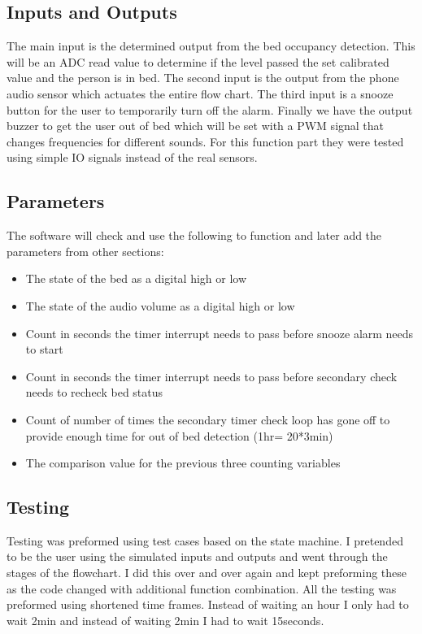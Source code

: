 \documentclass[11pt]{article}
\begin{document}
\subsection*{Inputs and Outputs}
The main input is the determined output from the bed occupancy detection. 
This will be an ADC read value to determine if the level passed the set calibrated value and the person is in bed. 
The second input is the output from the phone audio sensor which actuates the entire flow chart. 
The third input is a snooze button for the user to temporarily turn off the alarm.
Finally we have the output buzzer to get the user out of bed which will be set with a PWM signal that changes frequencies for different sounds. 
For this function part they were tested using simple IO signals instead of the real sensors.

\subsection*{Parameters}
The software will check and use the following to function and later add the parameters from other sections:
\begin{itemize}
	\item The state of the bed as a digital high or low
	\item The state of the audio volume as a digital high or low 
	\item Count in seconds the timer interrupt needs to pass before snooze alarm needs to start
	\item Count in seconds the timer interrupt needs to pass before secondary check needs to recheck bed status
	\item Count of number of times the secondary timer check loop has gone off to provide enough time for out of bed detection (1hr= 20*3min)
	\item The comparison value for the previous three counting variables 
\end{itemize}


\subsection*{Testing}
Testing was preformed using test cases based on the state machine. 
I pretended to be the user using the simulated inputs and outputs and went through the stages of the flowchart.
I did this over and over again and kept preforming these as the code changed with additional function combination. 
All the testing was preformed using shortened time frames. Instead of waiting an hour I only had to wait 2min and instead of waiting 2min I had to wait 15seconds. 
\end{document}
